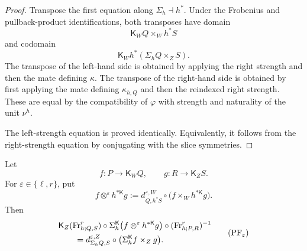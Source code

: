 \begin{proof}
Transpose the first equation along \(\Sigma_h\dashv h^*\).  Under the
Frobenius and pullback-product identifications, both transposes have domain
\[
    \mathsf K_WQ\times_Wh^*S
\]
and codomain
\[
    \mathsf K_Wh^*(\Sigma_hQ\times_ZS).
\]
The transpose of the left-hand side is obtained by applying the right
strength and then the mate defining \(\kappa\).  The transpose of the
right-hand side is obtained by first applying the mate defining
\(\kappa_{h,Q}\) and then the reindexed right strength.  These are equal by
the compatibility of \(\varphi\) with strength and naturality of the unit
\(\nu^h\).

The left-strength equation is proved identically.  Equivalently, it follows
from the right-strength equation by conjugating with the slice symmetries.
\end{proof}

\begin{lemma}
\label{lem:effectful-projection-formula}
Let
\[
    f:P\to\mathsf K_WQ,
    \qquad
    g:R\to\mathsf K_ZS.
\]
For \(\varepsilon\in\{\ell,r\}\), put
\[
    f\otimes^\varepsilon h^{*\mathsf K}g
    :=
    d^{\varepsilon,W}_{Q,h^*S}
    \circ
    \bigl(
        f\times_Wh^{*\mathsf K}g
    \bigr).
\]
Then
\[
\begin{aligned}
&
\mathsf K_Z(\operatorname{Fr}^{r}_{h;Q,S})
\circ
\Sigma_h^{\mathsf K}
\bigl(
    f\otimes^\varepsilon h^{*\mathsf K}g
\bigr)
\circ
(\operatorname{Fr}^{r}_{h;P,R})^{-1}
\\
&\qquad=
d^{\varepsilon,Z}_{\Sigma_hQ,S}
\circ
\bigl(
    \Sigma_h^{\mathsf K}f\times_Zg
\bigr).
\end{aligned}
\tag{\(\mathrm{PF}_\varepsilon\)}
\]
\end{lemma}

